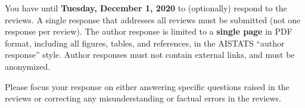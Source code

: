\documentclass{article}
\begin{document}
You have until \textbf{Tuesday, December 1, 2020} to (optionally) respond to the reviews. A single response that addresses all reviews must be submitted (not one response per review). The author response is limited to a \textbf{single page} in PDF format, including all figures, tables, and references, in the AISTATS ``author response'' style. Author responses must not contain external links, and must be anonymized.

Please focus your response on either answering specific questions raised in the reviews or correcting any misunderstanding or factual errors in the reviews.
\end{document}
